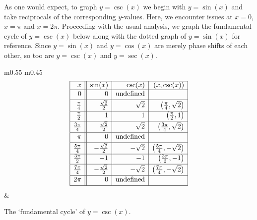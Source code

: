 As one would expect, to graph $y = \csc(x)$ we begin with $y = \sin(x)$ and take reciprocals of the corresponding $y$-values.  Here, we encounter issues at $x = 0$, $x = \pi$ and $x = 2\pi$.  Proceeding with the usual analysis, we graph the fundamental cycle of $y = \csc(x)$ below along with the dotted graph of $y=\sin(x)$ for reference.  Since $y = \sin(x)$ and $y = \cos(x)$ are merely phase shifts of each other, so too are $y = \csc(x)$ and $y = \sec(x)$. 

\medskip

\noindent\hskip-10pt\begin{minipage}{\textwidth}
\begin{center}
\begin{tabular}{m{} m{}}
\setlength{\extrarowheight}{2pt}
\[ \begin{array}{|r||r|r|r|}  

\hline

 x & \sin(x) & \csc(x) & (x,\csc(x)) \\ \hline
0  & 0 & \text{undefined} &  \\ [2pt]   \hline
\frac{\pi}{4}  & \frac{\sqrt{2}}{2} & \sqrt{2} & \left(\frac{\pi}{4}, \sqrt{2} \right) \\ [2pt] \hline 
\frac{\pi}{2}  & 1 & 1 & \left(\frac{\pi}{2}, 1 \right) \\ [2pt] \hline 
\frac{3\pi}{4}  & \frac{\sqrt{2}}{2} & \sqrt{2} & \left(\frac{3\pi}{4}, \sqrt{2} \right) \\ [2pt] \hline 
\pi & 0 & \text{undefined} &   \\ [2pt] \hline 
\frac{5\pi}{4}  & -\frac{\sqrt{2}}{2} & -\sqrt{2} & \left(\frac{5\pi}{4}, -\sqrt{2} \right) \\ [2pt] \hline 
\frac{3\pi}{2}  & -1 & -1 & \left(\frac{3\pi}{2},-1 \right)\\ [2pt] \hline 
\frac{7\pi}{4}  & -\frac{\sqrt{2}}{2} & -\sqrt{2} & \left(\frac{7\pi}{4}, -\sqrt{2} \right) \\ [2pt] \hline 
2\pi  & 0 & \text{undefined} &  \\  [2pt] \hline
\end{array} \] \setlength{\extrarowheight}{0pt} &

\end{tabular}
\end{center}
\captionsetup{type=figure}
\caption{The `fundamental cycle' of $y = \csc(x)$.}\label{fig:cscgraph1}
\end{minipage}

